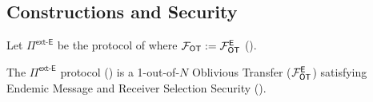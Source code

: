 \subsection{Constructions and Security}\label{sec:extSec}


\begin{definition}\label{def:ext_E_E}
	Let $\Pi^{\textsf{ext-E}}$ be the protocol of  where $\mathcal{F}_{\mathsf{OT}}:=\mathcal{F}_{\mathsf{OT}}^\mathsf{E}$ ().
\end{definition}



\begin{lemma}\label{lem:ext-E}
	The $\Pi^{\textsf{ext-E}}$ protocol () is a 1-out-of-$N$ Oblivious Transfer ($\mathcal{F}_{\mathsf{OT}}^\mathsf{E}$) satisfying Endemic Message and Receiver Selection Security ().
\end{lemma}
